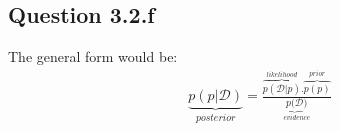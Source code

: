 \documentclass[a4paper]{article}
\begin{document}


\subsection*{Question 3.2.f}
The general form would be:
\begin{align*}
   \underset{posterior}{\underbrace{p(\textit{p}|\mathcal{D})}} = \frac{\overset{likelihood}{\overbrace{p(\mathcal{D}|\textit{p})}}.
   \overset{prior}{\overbrace{p(\textit{p})}}}{\underset{evidence}{\underbrace{p(\mathcal{D}})}}
\end{align*}

\end{document}
